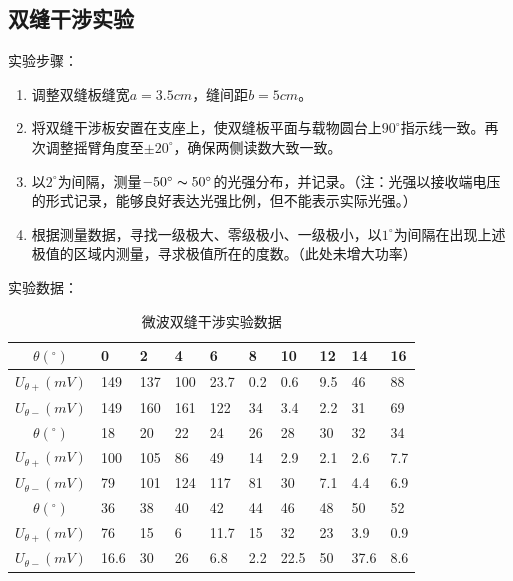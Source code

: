 \documentclass[11pt]{article}
\begin{document}
\subsection{双缝干涉实验}
\noindent 实验步骤：
\begin{enumerate}
    \item 调整双缝板缝宽$a=3.5cm$，缝间距$b=5cm$。
    \item 将双缝干涉板安置在支座上，使双缝板平面与载物圆台上$90^\circ$指示线一致。再次调整摇臂角度至$\pm20^\circ$，确保两侧读数大致一致。
    \item 以$2^\circ$为间隔，测量$-50^\circ\thicksim 50^\circ$的光强分布，并记录。（注：光强以接收端电压的形式记录，能够良好表达光强比例，但不能表示实际光强。）
    \item 根据测量数据，寻找一级极大、零级极小、一级极小，以$1^\circ$为间隔在出现上述极值的区域内测量，寻求极值所在的度数。（此处未增大功率）
\end{enumerate}
\noindent 实验数据：
        \begin{table}[H]
          \centering
          \caption{微波双缝干涉实验数据}
            \begin{tabularx}{0.75\textwidth}{|c|X|X|X|X|X|X|X|X|X|}\hline
            $\theta(^\circ)$      & 0      & 2      & 4      & 6      & 8      & 10     & 12     & 14     & 16 \\\hline
            $U_{\theta+}(mV)$     & 149    & 137    & 100    & 23.7   & 0.2    & 0.6    & 9.5    & 46     & 88 \\\hline
            $U_{\theta-}(mV)$    & 149    & 160    & 161    & 122    & 34     & 3.4    & 2.2    & 31     & 69 \\\hline
            $\theta(^\circ)$      & 18     & 20     & 22     & 24     & 26     & 28     & 30     & 32     & 34 \\\hline
            $U_{\theta+}(mV)$      & 100    & 105    & 86     & 49     & 14     & 2.9    & 2.1    & 2.6    & 7.7 \\\hline
            $U_{\theta-}(mV)$     & 79     & 101    & 124    & 117    & 81     & 30     & 7.1    & 4.4    & 6.9 \\\hline
            $\theta(^\circ)$      & 36     & 38     & 40     & 42     & 44     & 46     & 48     & 50     & 52 \\\hline
            $U_{\theta+}(mV)$      & 76     & 15     & 6      & 11.7   & 15     & 32     & 23     & 3.9    & 0.9 \\\hline
            $U_{\theta-}(mV)$     & 16.6   & 30     & 26     & 6.8    & 2.2    & 22.5   & 50     & 37.6   & 8.6 \\\hline
            \end{tabularx}%
          \label{tab:双缝干涉}%
        \end{table}%
\end{document}

